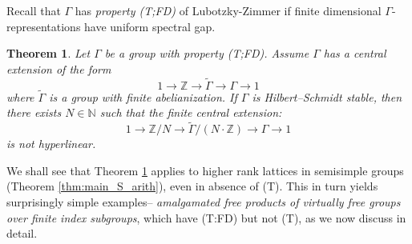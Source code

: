 \documentclass[11pt]{amsart}
\DeclareMathOperator{\SL}{SL}
\newcommand{\N}{{\mathbb{N}}}
\newcommand{\Z}{{\mathbb{Z}}}
\newtheorem{theorem}{Theorem}[section]
\theoremstyle{definition}
\theoremstyle{remark}
\theoremstyle{definition}
\newtheorem{problem}[theorem]{Problem}
\begin{document}
    


   Recall that $\Gamma$ has \emph{property (T;FD)} of Lubotzky-Zimmer \cite{LZ} if finite dimensional $\Gamma$-representations have uniform spectral gap. 

\begin{theorem}\label{thm:main-non-hyperlinear}
Let $\Gamma$ be a group with  property (T;FD). Assume $\Gamma$ has a central extension of the form 
\[
1\longrightarrow \Z\longrightarrow\widetilde\Gamma\longrightarrow\Gamma\longrightarrow1
\]
where $\widetilde{\Gamma}$ is a group with finite abelianization. If $\Gamma$  is Hilbert--Schmidt stable, then there exists $N \in \N$ such that the finite central extension:
\[
1\longrightarrow \Z/N  \longrightarrow\widetilde\Gamma / (N\cdot \Z)\longrightarrow\Gamma \longrightarrow1
\]
is not hyperlinear.
\end{theorem}

   We shall see that Theorem \ref{thm:main-non-hyperlinear} applies to higher rank lattices in semisimple groups (Theorem \ref{thm:main_S_arith}), even in absence of (T).
This in turn yields surprisingly simple examples-- \emph{amalgamated free products of virtually free groups over finite index subgroups}, which have (T:FD) but not (T), as we now discuss in detail.%
   
\end{document}
